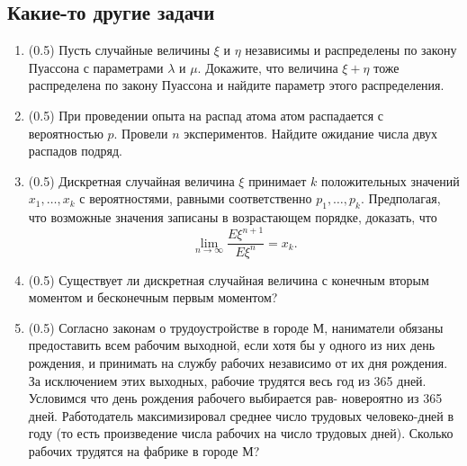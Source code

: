 \documentclass[a4paper, 14pt]{extarticle}
\begin{document}
\subsection{Какие-то другие задачи}
\begin{enumerate}
\item (0.5)
Пусть случайные величины $\xi$ и $\eta$ независимы и распределены по закону Пуассона с параметрами $\lambda$ и $\mu$. Докажите, что величина $\xi+\eta$ тоже распределена по закону Пуассона и найдите параметр этого распределения.

\item (0.5)
При проведении опыта на распад атома атом распадается с вероятностью $p$.
Провели $n$ экспериментов. Найдите ожидание числа двух распадов подряд.

\item (0.5) Дискретная случайная величина $\xi$ принимает $k$
	положительных значений $x_1,\ldots,x_k$ с вероятностями,
	равными соответственно $p_1,\ldots,p_k$. Предполагая, что
	возможные значения записаны в возрастающем порядке,
	доказать, что
	$$\lim_{n\rightarrow\infty}\frac{E\xi^{n+1}}{E\xi^n}=x_k. $$

\item (0.5) Существует ли дискретная случайная величина с конечным вторым моментом
	и бесконечным первым моментом?

\item (0.5) Согласно законам о трудоустройстве в городе М, наниматели обязаны предоставить всем рабочим выходной, если хотя бы у одного из них
	день рождения, и принимать на службу рабочих независимо от их дня
	рождения. За исключением этих выходных, рабочие трудятся весь год
	из 365 дней. Условимся что день рождения рабочего выбирается рав-
	новероятно из 365 дней. Работодатель максимизировал среднее число
	трудовых человеко-дней в году (то есть произведение числа рабочих
	на число трудовых дней). Сколько рабочих трудятся на фабрике в
	городе М?

\end{enumerate}
\end{document}
